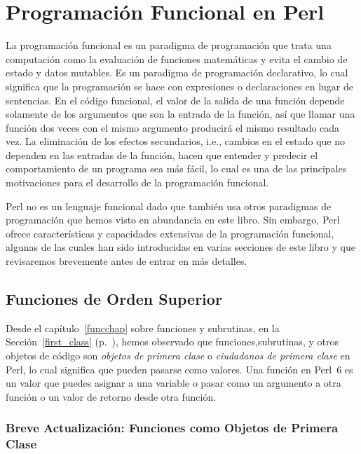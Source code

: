 \chapter{Programación Funcional en Perl}
\label{functional programming}

La programación funcional es un paradigma de programación que 
trata una computación como la evaluación de funciones matemáticas
y evita el cambio de estado y datos mutables. Es un paradigma de
programación declarativo, lo cual significa que la programación
se hace con expresiones o declaraciones en lugar de sentencias.
En el código funcional, el valor de la salida de una función 
depende solamente de los argumentos que son la entrada de la
función, así que llamar una función dos veces con el mismo argumento
producirá el mismo resultado cada vez. La eliminación de los efectos 
secundarios, i.e., cambios en el estado que no dependen en las
entradas de la función, hacen que entender y predecir el comportamiento
de un programa sea más fácil, lo cual es una de las principales 
motivaciones para el desarrollo de la programación funcional.


Perl no es un lenguaje funcional dado que también usa otros
paradigmas de programación que hemos visto en abundancia en
este libro. Sin embargo, Perl ofrece características y capacidades
extensivas de la programación funcional, algunas de las cuales
han sido introducidas en varias secciones de este libro y 
que revisaremos brevemente antes de entrar en más detalles.

\section{Funciones de Orden Superior}

Desde el capítulo~\ref{funcchap} sobre funciones y subrutinas,
en la Sección~\ref{first_class} (p.~\pageref{first_class}),
hemos observado que funciones,subrutinas, y otros objetos de
código son \emph{objetos de primera clase} o 
\emph{ciudadanos de primera clase} en Perl, lo cual significa que
pueden pasarse como valores. Una función en Perl~6 es
un valor que puedes asignar a una variable o pasar como
un argumento a otra función o un valor de retorno desde otra
función.

\subsection{Breve Actualización: Funciones como Objetos de Primera Clase}
\label{fco-refresher}

